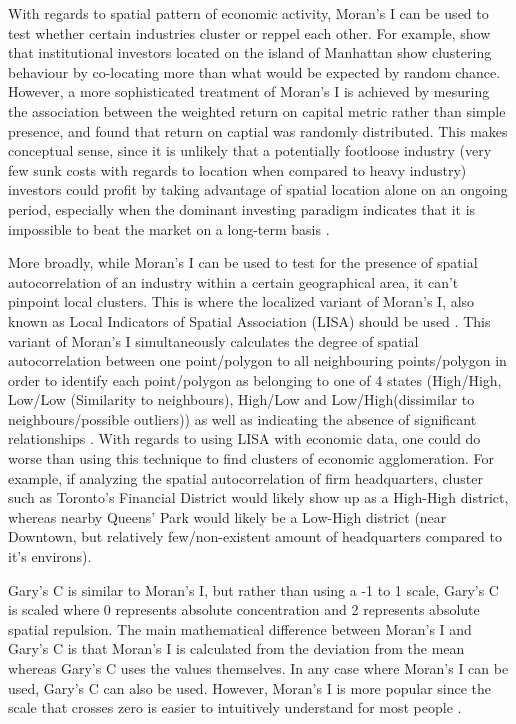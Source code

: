 \documentclass[12pt,letterpaper,notitlepage,onecolumn,final,openbib]{article}
\begin{document}
	With regards to spatial pattern of economic activity, Moran's I can be used to test whether certain industries cluster or reppel each other.  For example,  show that institutional investors located on the island of Manhattan show clustering behaviour by co-locating more than what would be expected by random chance.  However, a more sophisticated treatment of Moran's I is achieved by mesuring the association between the weighted return on capital metric rather than simple presence, and found that return on captial was randomly distributed.  This makes conceptual sense, since it is unlikely that a potentially footloose industry (very few sunk costs with regards to location when compared to heavy industry)  investors could profit by taking advantage of spatial location alone on an ongoing period, especially when the dominant investing paradigm indicates that it is impossible to beat the market on a long-term basis \cite{Malkiel2005}.  
	
	More broadly, while Moran's I can be used to test for the presence of spatial autocorrelation of an industry within a certain geographical area, it can't pinpoint local clusters.  This is where the localized variant of Moran's I, also known as Local Indicators of Spatial Association (LISA) should be used \cite{anselin1995local}.  This variant of Moran's I simultaneously calculates the degree of spatial autocorrelation between one point/polygon to all neighbouring points/polygon in order to identify each point/polygon as belonging to one of 4 states (High/High, Low/Low (Similarity to neighbours), High/Low and Low/High(dissimilar to neighbours/possible outliers)) as well as indicating the absence of significant relationships \cite{Anselin2003}.  With regards to using LISA with economic data, one could do worse than using this technique to find clusters of economic agglomeration.  For example, if analyzing the spatial autocorrelation of firm headquarters, cluster such as Toronto's Financial District would likely show up as a High-High district, whereas nearby Queens' Park would likely be a Low-High district (near Downtown, but relatively few/non-existent amount of headquarters compared to it's environs). 
	
	Gary's C is similar to Moran's I, but rather than using a -1 to 1 scale, Gary's C is scaled where 0 represents absolute concentration and 2 represents absolute spatial repulsion.  The main mathematical difference between Moran's I and Gary's C is that Moran's I is calculated from the deviation from the mean whereas Gary's C uses the values themselves. In any case where Moran's I can be used, Gary's C can also be used.  However, Moran's I is more popular since the scale that crosses zero is easier to intuitively understand for most people \cite{singleton2015introduction}.  
	
\end{document}
